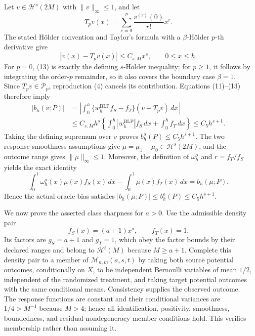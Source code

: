 Let \(v\in\mathcal H^s(2M)\) with \(\|v\|_\infty\le1\), and let
\[
T_pv(x)=\sum_{r=0}^p\frac{v^{(r)}(0)}{r!}x^r.
\tag{12}
\]
The stated H\"older convention and Taylor's formula with a \(\beta\)-H\"older \(p\)-th derivative give
\[
|v(x)-T_pv(x)|\le C_{s,M}x^s,
\qquad 0\le x\le h.
\tag{13}
\]
For \(p=0\), (13) is exactly the defining \(s\)-H\"older inequality; for \(p\ge1\), it follows by integrating the order-\(p\) remainder, so it also covers the boundary case \(\beta=1\). Since \(T_pv\in\mathcal P_p\), reproduction (4) cancels its contribution. Equations (11)--(13) therefore imply
\[
\begin{aligned}
|b_h(v;P)|
&=\left|\int_0^h\{w_h^{\mathrm{BLP}}f_S-f_T\}(v-T_pv)\,dx\right|\\
&\le C_{s,M}h^s
\left\{\int_0^h|w_h^{\mathrm{BLP}}|f_S\,dx+\int_0^hf_T\,dx\right\}
\le C_5h^{s+1}.
\end{aligned}
\tag{14}
\]
Taking the defining supremum over \(v\) proves \(b_h^o(P)\le C_5h^{s+1}\). The two response-smoothness assumptions give \(\mu=\mu_1-\mu_0\in\mathcal H^s(2M)\), and the outcome range gives \(\|\mu\|_\infty\le1\). Moreover, the definition of \(\omega_h^o\) and \(r=f_T/f_S\) yields the exact identity
\[
\int_0^1\omega_h^o(x)\mu(x)f_S(x)\,dx-
\int_0^1\mu(x)f_T(x)\,dx=b_h(\mu;P).
\tag{15}
\]
Hence the actual oracle bias satisfies \(|b_h(\mu;P)|\le b_h^o(P)\le C_5h^{s+1}\).

We now prove the asserted class sharpness for \(a>0\). Use the admissible density pair
\[
f_S(x)=(a+1)x^a,
\qquad f_T(x)=1.
\tag{16}
\]
Its factors are \(g_S=a+1\) and \(g_T=1\), which obey the factor bounds by their declared ranges and belong to \(\mathcal H^t(M)\) because \(M\ge a+1\). Complete this density pair to a member of \(\mathcal M_{n,m}(a,s,t)\) by taking both source potential outcomes, conditionally on \(X\), to be independent Bernoulli variables of mean \(1/2\), independent of the randomized treatment, and taking target potential outcomes with the same conditional means. Consistency supplies the observed outcome. The response functions are constant and their conditional variances are \(1/4>M^{-1}\) because \(M>4\); hence all identification, positivity, smoothness, boundedness, and residual-nondegeneracy member conditions hold. This verifies membership rather than assuming it.

